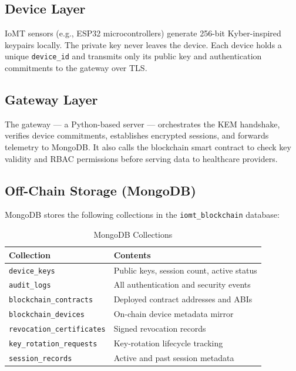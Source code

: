 \documentclass[conference]{IEEEtran}
\begin{document}
\subsection{Device Layer}
IoMT sensors (e.g., ESP32 microcontrollers) generate 256-bit Kyber-inspired keypairs
locally. The private key never leaves the device. Each device holds a unique
\texttt{device\_id} and transmits only its public key and authentication commitments
to the gateway over TLS.

\subsection{Gateway Layer}
The gateway — a Python-based server — orchestrates the KEM handshake, verifies device
commitments, establishes encrypted sessions, and forwards telemetry to MongoDB. It also
calls the blockchain smart contract to check key validity and RBAC permissions before
serving data to healthcare providers.

\subsection{Off-Chain Storage (MongoDB)}
MongoDB stores the following collections in the \texttt{iomt\_blockchain} database:

\begin{table}[!t]
\centering
\caption{MongoDB Collections}
\label{tab:mongo}
\begin{tabularx}{\columnwidth}{lX}
\toprule
\textbf{Collection} & \textbf{Contents} \\
\midrule
\texttt{device\_keys}          & Public keys, session count, active status \\
\texttt{audit\_logs}           & All authentication and security events \\
\texttt{blockchain\_contracts} & Deployed contract addresses and ABIs \\
\texttt{blockchain\_devices}   & On-chain device metadata mirror \\
\texttt{revocation\_certificates} & Signed revocation records \\
\texttt{key\_rotation\_requests}  & Key-rotation lifecycle tracking \\
\texttt{session\_records}      & Active and past session metadata \\
\bottomrule
\end{tabularx}
\end{table}
\end{document}
